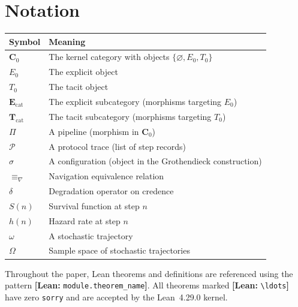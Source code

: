 \documentclass[12pt,a4paper]{article}
\theoremstyle{plain}
\theoremstyle{definition}
\theoremstyle{remark}
\newcommand{\leanref}[1]{\textbf{[Lean:} \nolinkurl{#1}\textbf{]}}
\newcommand{\Czero}{\mathbf{C}_0}
\newcommand{\Ecat}{\mathbf{E}_{\mathrm{cat}}}
\newcommand{\Tcat}{\mathbf{T}_{\mathrm{cat}}}
\newcommand{\Eobj}{E_0}
\newcommand{\Tobj}{T_0}
\newcommand{\navequiv}{\equiv_\nabla}
\begin{document}
\newpage
\tableofcontents
\newpage

\section*{Notation}

\begin{center}
\begin{tabular}{ll}
\toprule
Symbol & Meaning \\
\midrule
$\Czero$ & The kernel category with objects $\{\varnothing, \Eobj, \Tobj\}$ \\
$\Eobj$ & The explicit object \\
$\Tobj$ & The tacit object \\
$\Ecat$ & The explicit subcategory (morphisms targeting $\Eobj$) \\
$\Tcat$ & The tacit subcategory (morphisms targeting $\Tobj$) \\
$\Pi$ & A pipeline (morphism in $\Czero$) \\
$\mathcal{P}$ & A protocol trace (list of step records) \\
$\sigma$ & A configuration (object in the Grothendieck construction) \\
$\navequiv$ & Navigation equivalence relation \\
$\delta$ & Degradation operator on credence \\
$S(n)$ & Survival function at step $n$ \\
$h(n)$ & Hazard rate at step $n$ \\
$\omega$ & A stochastic trajectory \\
$\Omega$ & Sample space of stochastic trajectories \\
\bottomrule
\end{tabular}
\end{center}

Throughout the paper, Lean theorems and definitions are referenced using the pattern
\leanref{module.theorem\_name}. All theorems marked \leanref{\ldots} have zero
\texttt{sorry} and are accepted by the Lean~4.29.0 kernel.

\newpage


\newpage

\newpage

\newpage

\newpage

\newpage

\newpage

\newpage


\end{document}
